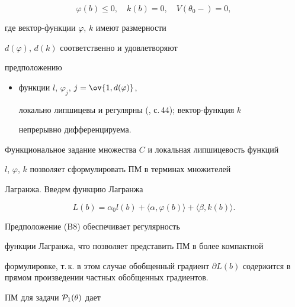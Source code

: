 $$


\varphi(b)\leq 0,\quad k(b)=0,\quad


V(\theta_0-)=0,


$$


где вектор-функции $\varphi$, $k$ имеют размерности


$d(\varphi)$, $d(k)$ соответственно и удовлетворяют


предположению


\begin{itemize}


\item[(B8)] функции $l$, $\varphi_j$, $j=\ov{1,d(\varphi)}$,


локально липшицевы и регулярны (\cite{23}, с.\,44); вектор-функция $k$


непрерывно дифференцируема.


\end{itemize}





Функциональное задание множества $C$ и локальная липшицевость функций


$l$, $\varphi$, $k$ позволяет сформулировать ПМ в терминах множителей


Лагранжа. Введем функцию Лагранжа


$$


L(b)=\alpha_0 l(b)+\langle \alpha,\varphi(b)\rangle +\langle


\beta,k(b)\rangle.


$$


Предположение (B8) обеспечивает регулярность


функции Лагранжа, что позволяет представить ПМ в более компактной


формулировке, т.\,к. в этом случае обобщенный градиент $\partial


L(b)$ содержится в прямом произведении частных обобщенных градиентов.





ПМ для задачи ${\cal P}_1(\theta)$ дает





